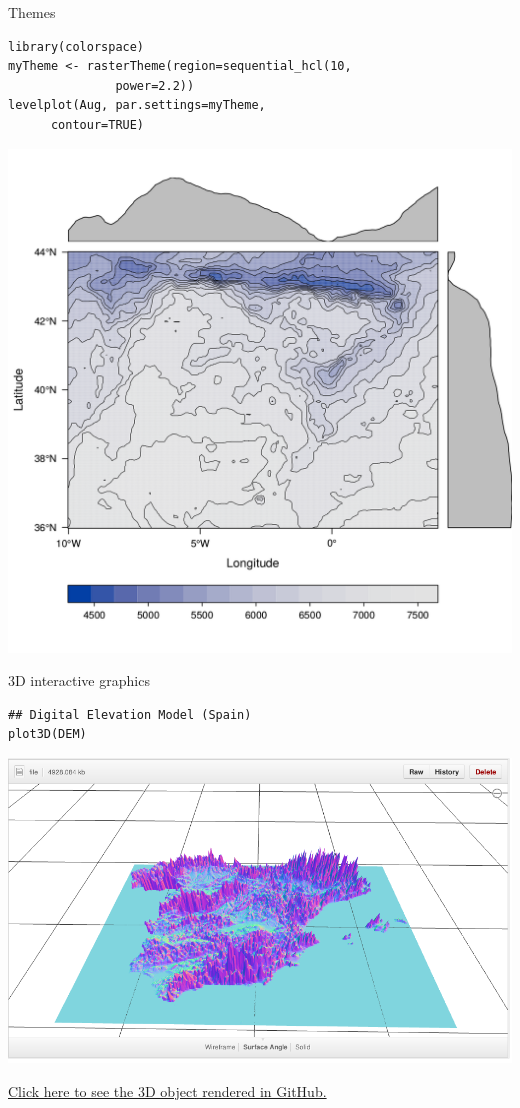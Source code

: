 \documentclass[xcolor={usenames,svgnames,dvipsnames}]{beamer}
\begin{document}
\begin{frame}[fragile,label=sec-10]{Themes}
 \lstset{language=R,numbers=none}
\begin{lstlisting}
library(colorspace)
myTheme <- rasterTheme(region=sequential_hcl(10,
			   power=2.2))
levelplot(Aug, par.settings=myTheme,
	  contour=TRUE)
\end{lstlisting}

\begin{center}
\includegraphics[height=0.65\textheight]{figs/levelplot_colorspace.png}
\end{center}
\end{frame}
\begin{frame}[fragile,label=sec-11]{3D interactive graphics}
 \lstset{language=R,numbers=none}
\begin{lstlisting}
## Digital Elevation Model (Spain)
plot3D(DEM)
\end{lstlisting}

\begin{center}
\includegraphics[height=0.5\textheight]{figs/DEM_STL_GitHub.png} 

\href{https://github.com/oscarperpinan/spacetime-vis/blob/gh-pages/images/DEM.stl}{Click here to see the 3D object rendered in GitHub.}
\end{center}
\end{frame}
\end{document}
